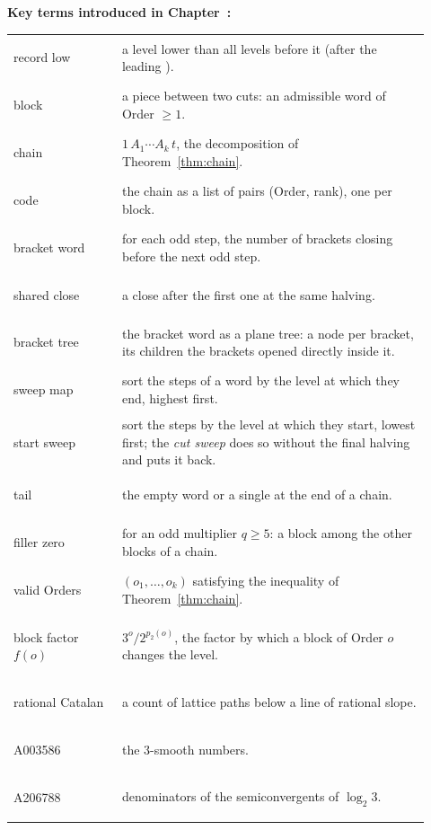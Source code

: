\documentclass[11pt,a4paper,titlepage]{article}
\makeatletter
\newcommand{\boxhere}[1]{\leavevmode
  \Hy@raisedlink{\hyper@anchorstart{box:#1}\hyper@anchorend}}
\newcommand{\termlink}[2]{\hyperlink{term:#1}{#2}}
\newif\ifpaper
\newenvironment{wordbox}
  {\par\ifpaper\vspace*{\fill}\vspace{\bigskipamount}\else\medskip\fi
   \noindent\begin{lrbox}{\wordboxbin}%
   \begin{minipage}{\dimexpr\linewidth-2\fboxsep-2\fboxrule\relax}\small
   \textbf{Key terms introduced in Chapter~\thesection:}\par\smallskip
   \begin{tabular}{@{}>{\bfseries\boldmath\raggedright\arraybackslash}p{0.24\linewidth}p{0.68\linewidth}@{}}}
  {\end{tabular}\end{minipage}\end{lrbox}%
   \fcolorbox{black!40}{black!3}{\usebox{\wordboxbin}}\par\ifpaper\else\medskip\fi}
\makeatother
\begin{document}
\begin{wordbox}
\boxhere{recordlow}record low\index{record low@\termlink{recordlow}{record low}|textbf} & a level lower than all levels before it (after the leading \bw{1}). \\
\boxhere{block}block\index{block@\termlink{block}{block}|textbf} & a piece between two cuts: an admissible word of Order $\ge 1$. \\
\boxhere{chain}chain\index{chain@\termlink{chain}{chain}|textbf} & $1\,A_1\cdots A_k\,t$, the decomposition of Theorem~\ref{thm:chain}. \\
\boxhere{code}code\index{code@\termlink{code}{code}|textbf} & the chain as a list of pairs (Order, rank), one per block. \\
\boxhere{bracketword}bracket word\index{bracket word@\termlink{bracketword}{bracket word}|textbf} & for each odd step, the number of brackets closing before the next
  odd step. \\
\boxhere{sharedclose}shared close\index{shared close@\termlink{sharedclose}{shared close}|textbf} & a close after the first one at the same halving. \\
\boxhere{brackettree}bracket tree\index{bracket tree@\termlink{brackettree}{bracket tree}|textbf} & the bracket word as a plane tree: a node per bracket, its children
  the brackets opened directly inside it. \\
\boxhere{sweepmap}sweep map\index{sweep map@\termlink{sweepmap}{sweep map}|textbf} & sort the steps of a word by the level at which they end, highest
  first. \\
\boxhere{startsweep}start sweep\index{start sweep@\termlink{startsweep}{start sweep}|textbf} & sort the steps by the level at which they start, lowest first;
  the \boxhere{cutsweep}\emph{cut sweep}\index{cut sweep@\termlink{cutsweep}{cut sweep}|textbf} does so without the final halving and puts it back. \\
\boxhere{tail}tail\index{tail@\termlink{tail}{tail}|textbf} & the empty word or a single \bw{0} at the end of a chain. \\
\boxhere{fillerzero}filler zero\index{filler zero@\termlink{fillerzero}{filler zero}|textbf} & for an odd multiplier $q \ge 5$: a block \bw{0} among the other
  blocks of a chain. \\
\boxhere{validorders}valid Orders\index{valid orders@\termlink{validorders}{valid Orders}|textbf} & $(o_1, \dots, o_k)$ satisfying the inequality of
  Theorem~\ref{thm:chain}. \\
\boxhere{blockfactor}block factor $f(o)$\index{block factor@\termlink{blockfactor}{block factor $f(o)$}|textbf} & $3^o/2^{p_2(o)}$, the factor by which a block of
  Order $o$ changes the level. \\
\boxhere{ratcatalan}rational Catalan\index{rational catalan@\termlink{ratcatalan}{rational Catalan}|textbf} & a count of lattice paths below a line of rational slope. \\
A003586\index{OEIS!A003586} & the $3$-smooth numbers. \\
A206788\index{OEIS!A206788} & denominators of the semiconvergents of $\log_2 3$.
\end{wordbox}
\end{document}

